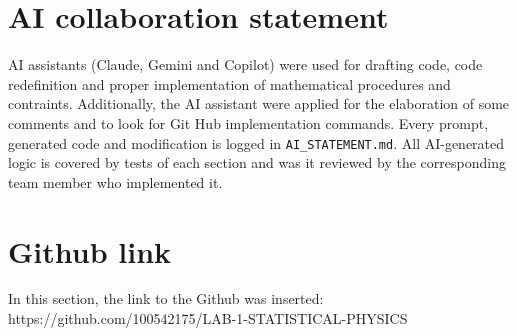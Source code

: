 \documentclass[11pt,a4paper]{article}
\begin{document}
\section{AI collaboration statement}
AI assistants (Claude, Gemini and Copilot) were used for drafting code, code redefinition and proper implementation of mathematical procedures and contraints. Additionally, the AI assistant were applied for the elaboration of some comments and to look for Git Hub implementation commands. Every prompt, generated code and modification is logged in \texttt{AI\_STATEMENT.md}.
All AI-generated logic is covered by tests of each section and was it reviewed by the corresponding team member who implemented it.
\section{Github link}
In this section, the link to the Github was inserted: https://github.com/100542175/LAB-1-STATISTICAL-PHYSICS
\end{document}
